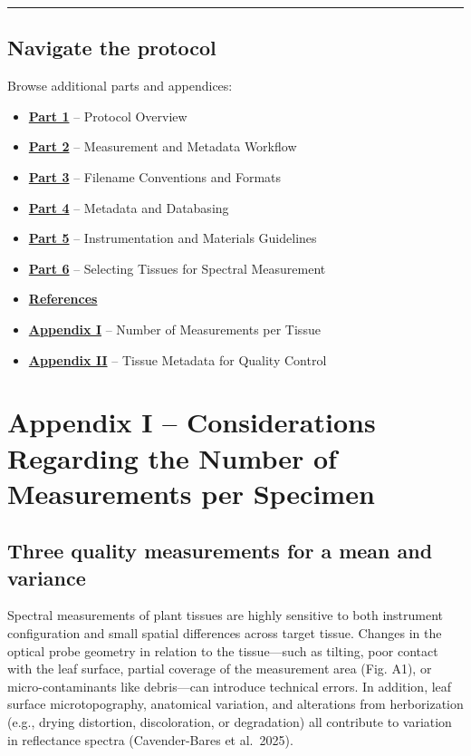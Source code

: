 \documentclass[
  letterpaper,
  DIV=11,
  numbers=noendperiod]{scrreprt}
\providecommand{\tightlist}{%
  \setlength{\itemsep}{0pt}\setlength{\parskip}{0pt}}
\begin{document}
\begin{center}\rule{0.5\linewidth}{0.5pt}\end{center}

\section{Navigate the protocol}\label{navigate-the-protocol-7}

Browse additional parts and appendices:

\begin{itemize}
\tightlist
\item
  \hyperref[part1]{\textbf{Part 1}} -- Protocol Overview
\item
  \hyperref[part2]{\textbf{Part 2}} -- Measurement and Metadata Workflow
\item
  \hyperref[part3]{\textbf{Part 3}} -- Filename Conventions and Formats
\item
  \hyperref[part4]{\textbf{Part 4}} -- Metadata and Databasing
\item
  \hyperref[part5]{\textbf{Part 5}} -- Instrumentation and Materials
  Guidelines
\item
  \hyperref[part6]{\textbf{Part 6}} -- Selecting Tissues for Spectral
  Measurement
\item
  \hyperref[references]{\textbf{References}}
\item
  \hyperref[app1]{\textbf{Appendix I}} -- Number of Measurements per
  Tissue
\item
  \hyperref[app2]{\textbf{Appendix II}} -- Tissue Metadata for Quality
  Control
\end{itemize}


\chapter{Appendix I -- Considerations Regarding the Number of
Measurements per
Specimen}\label{appendix-i-considerations-regarding-the-number-of-measurements-per-specimen}

\section{Three quality measurements for a mean and variance}\label{app1}

Spectral measurements of plant tissues are highly sensitive to both
instrument configuration and small spatial differences across target
tissue. Changes in the optical probe geometry in relation to the
tissue---such as tilting, poor contact with the leaf surface, partial
coverage of the measurement area (Fig. A1), or micro-contaminants like
debris---can introduce technical errors. In addition, leaf surface
microtopography, anatomical variation, and alterations from
herborization (e.g., drying distortion, discoloration, or degradation)
all contribute to variation in reflectance spectra (Cavender-Bares et
al.~2025).
\end{document}
